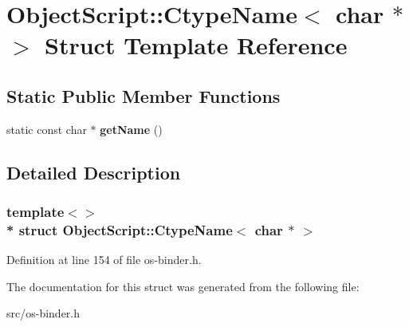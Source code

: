 \hypertarget{struct_object_script_1_1_ctype_name_3_01_01char_01_5_01_4}{}\section{Object\+Script\+:\+:Ctype\+Name$<$ char $\ast$ $>$ Struct Template Reference}
\label{struct_object_script_1_1_ctype_name_3_01_01char_01_5_01_4}
\subsection*{Static Public Member Functions}
\begin{DoxyCompactItemize}
\item 
static const char $\ast$ {\bfseries get\+Name} ()\hypertarget{struct_object_script_1_1_ctype_name_3_01_01char_01_5_01_4_abe3bf0805a2abb145b308106b104196f}{}\label{struct_object_script_1_1_ctype_name_3_01_01char_01_5_01_4_abe3bf0805a2abb145b308106b104196f}

\end{DoxyCompactItemize}


\subsection{Detailed Description}
\subsubsection*{template$<$$>$\\*
struct Object\+Script\+::\+Ctype\+Name$<$  char $\ast$ $>$}



Definition at line 154 of file os-\/binder.\+h.



The documentation for this struct was generated from the following file\+:\begin{DoxyCompactItemize}
\item 
src/os-\/binder.\+h\end{DoxyCompactItemize}
